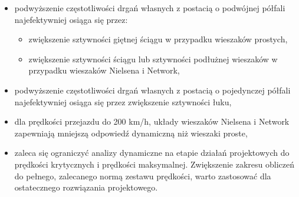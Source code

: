 \begin{itemize}
	\item podwyższenie częstotliwości drgań własnych z postacią o podwójnej półfali najefektywniej osiąga się przez: 
	\begin{itemize}
	\item zwiększenie sztywności giętnej ściągu w przypadku wieszaków prostych, 
	\item zwiększenie sztywności ściągu lub sztywności podłużnej wieszaków w przypadku wieszaków Nielsena i Network,
	\end{itemize}
	\item podwyższenie częstotliwości drgań własnych z postacią o pojedynczej półfali najefektywniej osiąga się przez zwiększenie sztywności łuku,
	\item dla prędkości przejazdu do 200 km/h, układy wieszaków Nielsena i Network zapewniają mniejszą odpowiedź dynamiczną niż wieszaki proste,
	\item zaleca się ograniczyć analizy dynamiczne na etapie działań projektowych do prędkości krytycznych i prędkości maksymalnej. Zwiększenie zakresu obliczeń do pełnego, zalecanego normą zestawu prędkości, warto zastosować dla ostatecznego rozwiązania projektowego.
\end{itemize}


